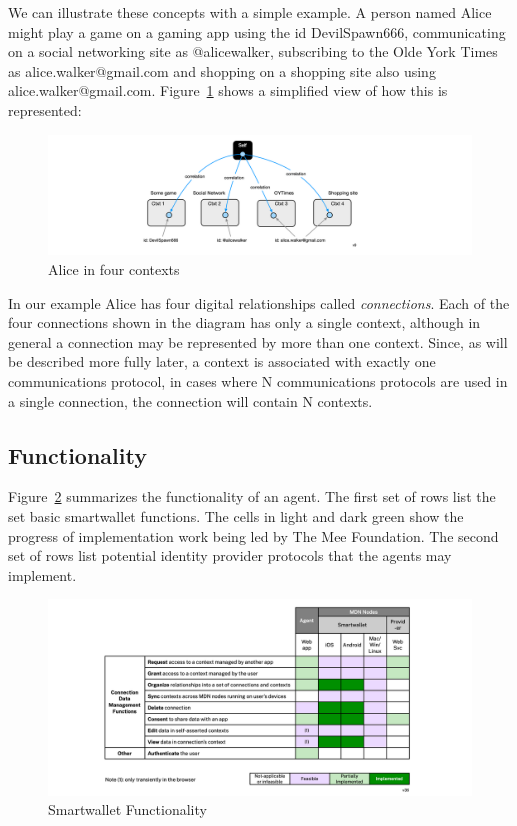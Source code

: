 \documentclass[11pt, oneside]{article}   	%
\begin{document}
We can illustrate these concepts with a simple example. A person named Alice might play a game on a gaming app using the id DevilSpawn666, communicating on a social networking site as @alicewalker, subscribing to the Olde York Times as alice.walker@gmail.com and shopping on a shopping site also using alice.walker@gmail.com. Figure~\ref{fig:four-contexts} shows a simplified view of how this is represented:

\begin{figure}[htbp]
\includegraphics[width=\textwidth]{./images/example1.png}
\caption{Alice in four contexts}
\label{fig:four-contexts}
\end{figure}

In our example Alice has four digital relationships called \emph{connections}. Each of the four connections shown in the diagram has only a single context, although in general a connection may be represented by more than one context. Since, as will be described more fully later, a context is associated with exactly one communications protocol, in cases where N communications protocols are used in a single connection, the connection will contain N contexts. 

\subsection{Functionality}

Figure~\ref{fig:functionality} summarizes the functionality of an agent.  The first set of rows list the set basic smartwallet functions.  The cells in light and dark green show the progress of implementation work being led by The Mee Foundation. The second set of rows list potential identity provider protocols that the agents may implement.

\begin{figure}[htbp]
\includegraphics[width=\textwidth]{./images/identity-agent-functionality.png}
\caption{Smartwallet Functionality}
\label{fig:functionality}
\end{figure}
\end{document}
